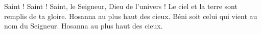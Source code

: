 Saint ! Saint ! Saint, le Seigneur,
Dieu de l’univers !
Le ciel et la terre sont remplis de ta gloire.
Hosanna au plus haut des cieux.
Béni soit celui qui vient au nom du Seigneur.
Hosanna au plus haut des cieux.
